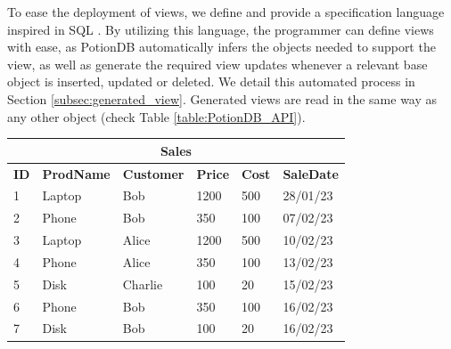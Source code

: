\documentclass[sigconf, nonacm]{acmart}
\begin{document}
To ease the deployment of views, we define and provide a specification language inspired in SQL \cite{sequel}.
By utilizing this language, the programmer can define views with ease, as PotionDB automatically infers the objects needed to support the view, as well as generate the required view updates whenever a relevant base object is inserted, updated or deleted. 
We detail this automated process in Section \ref{subsec:generated_view}.
Generated views are read in the same way as any other object (check Table \ref{table:PotionDB_API}).

\begin{table}[t]
	\setlength\tabcolsep{3.5pt}
	\small
	\begin{minipage}{0.5\textwidth}
		\centering
		\begin{tabular}{llllll}
			\multicolumn{6}{c}{\textbf{Sales}} \vspace{0.4em} \\%
					\hline
			\textbf{ID} & \textbf{ProdName} & \textbf{Customer} & \textbf{Price} & \textbf{Cost} & \textbf{SaleDate} \\ \hline
			1  & Laptop      & Bob      & 1200       & 500 & 28/01/23 \\
			2  & Phone      & Bob      & 350       & 100 & 07/02/23 \\
			3  & Laptop      & Alice      & 1200      & 500 & 10/02/23 \\
			4  & Phone      & Alice      & 350       & 100 & 13/02/23 \\
			5  & Disk      & Charlie      & 100        & 20 & 15/02/23 \\ 
			6  & Phone      & Bob      & 350       & 100 & 16/02/23 \\
			7  & Disk      & Bob      & 100       & 20 & 16/02/23 \\ \hline
		\end{tabular}
		\vspace{1em}
		\label{table:sales}
	\end{minipage}
\end{table}
\end{document}
